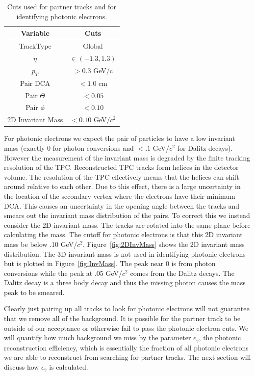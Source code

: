 \begin{table}
\centering
\begin{tabular}{|c|c|}
\hline
Variable         & Cuts \\
\hline
TrackType   & Global \\
\hline
$\eta$   & $\in(-1.3,1.3)$ \\
\hline
$p_T$   & $> 0.3$ GeV/c \\
\hline
Pair DCA  & $< 1.0$ cm \\
\hline
Pair $\Theta$   & $< 0.05$ \\
\hline
Pair $\phi$   & $< 0.10$ \\
\hline
2D Invariant Mass   & $< 0.10$ GeV/$c^2$ \\
\hline
\end{tabular}
\caption[Photonic Electron Cuts]{Cuts used for partner tracks and for identifying photonic electrons.}
\label{tab:pe_cuts}
\end{table}

For photonic electrons we expect the pair of particles to have a low invariant mass (exactly 0 for photon conversions and $< .1$ GeV/$c^2$ for Dalitz decays). However the measurement of the invariant mass is degraded by the finite tracking resolution of the TPC. Reconstructed TPC tracks form helices in the detector volume. The resolution of the TPC effectively means that the helices can shift around relative to each other. Due to this effect, there is a large uncertainty in the location of the secondary vertex where the electrons have their minimum DCA. This causes an uncertainty in the opening angle between the tracks and smears out the invariant mass distribution of the pairs. To correct this we instead consider the 2D invariant mass. The tracks are rotated into the same plane before calculating the mass. The cutoff for photonic electrons is that this 2D invariant mass be below .10 GeV/$c^2$. Figure~\ref{fig:2DInvMass} shows the 2D invariant mass distribution. The 3D invariant mass is not used in identifying photonic electrons but is plotted in Figure~\ref{fig:InvMass}. The peak near 0 is from photon conversions while the peak at .05 GeV/$c^2$ comes from the Dalitz decays. The Dalitz decay is a three body decay and thus the missing photon causes the mass peak to be smeared.

Clearly just pairing up all tracks to look for photonic electrons will not guarantee that we remove all of the background. It is possible for the partner track to be outside of our acceptance or otherwise fail to pass the photonic electron cuts. We will quantify how much background we miss by the parameter $\epsilon_\gamma$, the photonic reconstruction efficiency, which is essentially the fraction of all photonic electrons we are able to reconstruct from searching for partner tracks. The next section will discuss how $\epsilon_\gamma$ is calculated.

